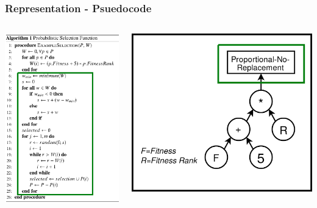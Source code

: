 \documentclass{beamer}
\begin{document}
	\begin{frame}
		\frametitle{Representation - Psuedocode}
		\begin{columns}
		\begin{column}{0.5\textwidth}
			\includegraphics[height=0.8\paperheight]{example_eppsea_code_green_highlight}		
		\end{column}
		\begin{column}{0.5\textwidth}
			\includegraphics[width=\textwidth]{example_eppsea_no_forks_green_highlight}		

\end{column}
\end{columns}
\end{frame}
\end{document}
